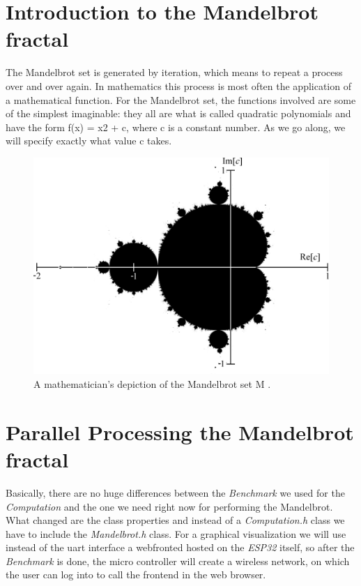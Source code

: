 \newpage

\section{Introduction to the Mandelbrot fractal} \label{chap:mandelbrotIntroduction}
The Mandelbrot set is generated by iteration, which means to repeat a process over and over again. In mathematics this process is most often the application of a mathematical function.
For the Mandelbrot set, the functions involved are some of the simplest imaginable: they all are what is called quadratic polynomials and have the form f(x) = x2 + c, where c is a constant number. As we go along, we will specify exactly what value c takes.

\begin{figure}[htbp]
	\centerline{\includegraphics[width=0.9\linewidth]{images/Mandelset_hires.png}}
	\caption{ A mathematician's depiction of the Mandelbrot set M \parencite{internet14}. }
	\label{fig:mandelbrotSet}
\end{figure}  


\newpage

\section{Parallel Processing the Mandelbrot fractal}

Basically, there are no huge differences between the \textit{Benchmark} we used for the \textit{Computation} and the one we need right now for performing the Mandelbrot. What changed are the class properties and instead of a \textit{Computation.h} class we have to include the \textit{Mandelbrot.h} class. For a graphical visualization we will use instead of the uart interface a webfronted hosted on the \textit{ESP32} itself, so after the \textit{Benchmark} is done, the micro controller will create a wireless network, on which the user can log into to call the frontend in the web browser.

